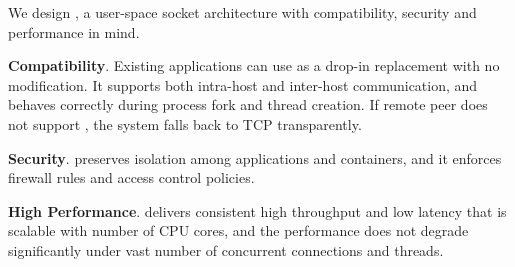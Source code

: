 



We design \sys{}, a user-space socket architecture with compatibility, security and performance in mind.
\begin{ecompact}
	\item \textbf{Compatibility}.
	Existing applications can use \sys{} as a drop-in replacement with no modification.
	It supports both intra-host and inter-host communication, and behaves correctly during process fork and thread creation.
	If remote peer does not support \sys{}, the system falls back to TCP transparently.
	\item \textbf{Security}.
	\sys{} preserves isolation among applications and containers, and it enforces firewall rules and access control policies.
	\item \textbf{High Performance}.
	\sys{} delivers consistent high throughput and low latency that is scalable with number of CPU cores, and the performance does not degrade significantly under vast number of concurrent connections and threads.
\end{ecompact}



